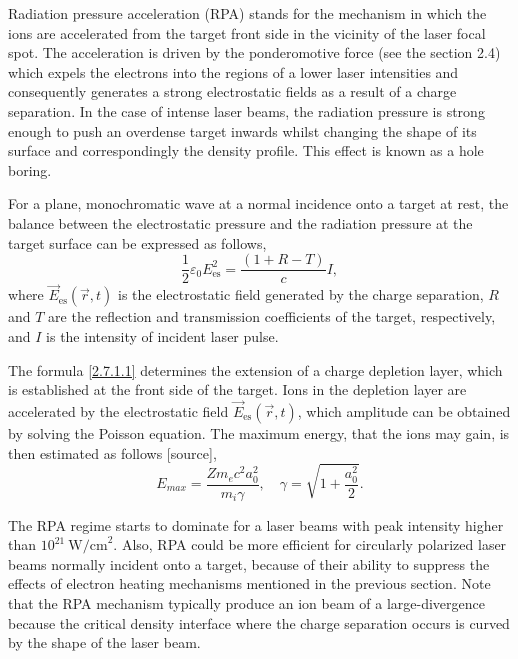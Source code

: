 Radiation pressure acceleration (RPA) stands for the mechanism in which the ions are accelerated from the target front side in the vicinity of the laser focal spot. The acceleration is driven by the ponderomotive force (see the section 2.4) which expels the electrons into the regions of a lower laser intensities and consequently generates a strong electrostatic fields as a result of a charge separation. In the case of intense laser beams, the radiation pressure is strong enough to push an overdense target inwards whilst changing the shape of its surface and correspondingly the density profile. This effect is known as a hole boring.

For a plane, monochromatic wave at a normal incidence onto a target at rest, the balance between the electrostatic pressure and the radiation pressure at the target surface can be expressed as follows,
\begin{equation}
\label{2.7.1.1}
\frac{1}{2} \varepsilon_0 E_{\mathrm{es}}^2 = \frac{\left( 1 + R - T \right)}{c} I,
\end{equation}
where $ \vec{E}_{\mathrm{es}} \left(\vec{r}, t \right) $ is the electrostatic field generated by the charge separation, $ R $ and $ T $ are the reflection and transmission coefficients of the target, respectively, and $ I $ is the intensity of incident laser pulse.

The formula \ref{2.7.1.1} determines the extension of a charge depletion layer, which is established at the front side of the target. Ions in the depletion layer are accelerated by the electrostatic field $ \vec{E}_{\mathrm{es}} \left(\vec{r}, t \right) $, which amplitude can be obtained by solving the Poisson equation. The maximum energy, that the ions may gain, is then estimated as follows [source],
\begin{equation}
E_{max} = \frac{Z m_e c^2 a_0^2}{m_i \gamma}, \quad \gamma = \sqrt{1 + \frac{a_0^2}{2}}.
\end{equation}
 
The RPA regime starts to dominate for a laser beams with peak intensity higher than $ 10^{21} \  \mathrm{W/cm}^2 $. Also, RPA could be more efficient for circularly polarized laser beams normally incident onto a target, because of their ability to suppress the effects of electron heating mechanisms mentioned in the previous section. Note that the RPA mechanism typically produce an ion beam of a large-divergence because the critical density interface where the charge separation occurs is curved by the shape of the laser beam.

